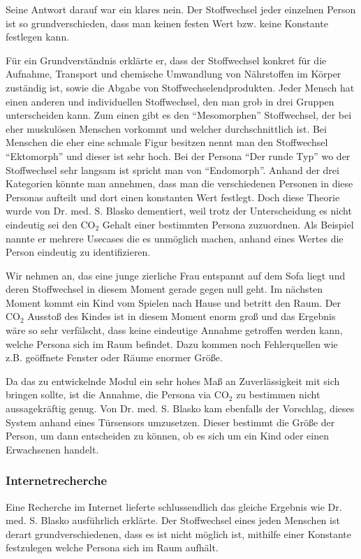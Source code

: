 Seine Antwort darauf war ein klares nein. Der Stoffwechsel jeder einzelnen Person ist so grundverschieden, dass man keinen festen Wert bzw. keine Konstante festlegen kann. 

Für ein Grundverständnis erklärte er, dass der Stoffwechsel konkret für
die Aufnahme, Transport und chemische Umwandlung von Nährstoffen im Körper zuständig ist, sowie die Abgabe von Stoffwechselendprodukten. Jeder Mensch hat einen anderen und individuellen Stoffwechsel, den man grob in drei Gruppen unterscheiden kann. Zum einen gibt es den "`Mesomorphen"' Stoffwechsel, der bei eher muskulösen Menschen vorkommt und welcher durchschnittlich ist. Bei Menschen die eher eine schmale Figur besitzen nennt man den Stoffwechsel "`Ektomorph"' und dieser ist sehr hoch. Bei der Persona "`Der runde Typ"' wo der Stoffwechsel sehr langsam ist spricht man von "`Endomorph"'. Anhand der drei Kategorien könnte man annehmen, dass man die verschiedenen Personen in diese Personas aufteilt und dort einen konstanten Wert festlegt. Doch diese Theorie wurde von Dr. med. S. Blasko dementiert, weil trotz der Unterscheidung es nicht eindeutig sei den CO$_2$ Gehalt einer bestimmten Persona zuzuordnen. Als Beispiel nannte er mehrere Usecases die es unmöglich machen, anhand eines Wertes die Person eindeutig zu identifizieren.

Wir nehmen an, das eine junge zierliche Frau entspannt auf dem Sofa liegt und deren Stoffwechsel in diesem Moment gerade gegen null geht. Im nächsten Moment kommt ein Kind vom Spielen nach Hause und betritt den Raum. Der CO$_2$ Ausstoß des Kindes ist in diesem Moment enorm groß und das Ergebnis wäre so sehr verfälscht, dass keine eindeutige Annahme getroffen werden kann, welche Persona sich im Raum befindet. Dazu kommen noch Fehlerquellen wie z.B. geöffnete Fenster
oder Räume enormer Größe.

Da das zu entwickelnde Modul ein sehr hohes Maß an Zuverlässigkeit mit sich
bringen sollte, ist die Annahme, die Persona via CO$_2$ zu bestimmen nicht aussagekräftig genug. Von Dr. med. S. Blasko kam ebenfalls der Vorschlag, dieses System anhand eines Türsensors umzusetzen. Dieser bestimmt die Größe der Person, um dann entscheiden zu können, ob es sich um ein Kind oder einen Erwachsenen handelt.

\subsubsection{Internetrecherche}
Eine Recherche im Internet lieferte schlussendlich das gleiche Ergebnis wie  Dr. med. S. Blasko ausführlich erklärte. Der Stoffwechsel eines jeden Menschen ist derart grundverschiedenen, dass es ist nicht möglich ist, mithilfe einer Konstante festzulegen welche Persona sich im Raum aufhält.

